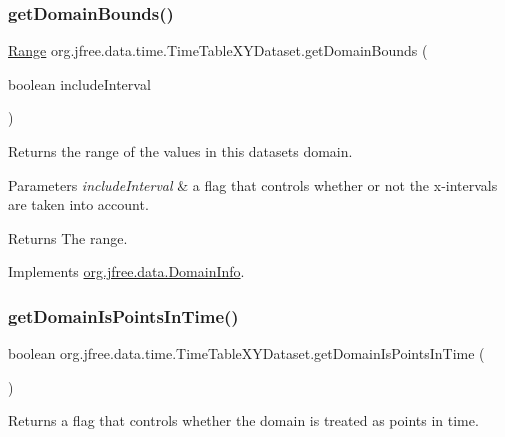 \subsubsection{\texorpdfstring{get\+Domain\+Bounds()}{getDomainBounds()}}
{\footnotesize\ttfamily \mbox{\hyperlink{classorg_1_1jfree_1_1data_1_1_range}{Range}} org.\+jfree.\+data.\+time.\+Time\+Table\+X\+Y\+Dataset.\+get\+Domain\+Bounds (\begin{DoxyParamCaption}\item[{boolean}]{include\+Interval }\end{DoxyParamCaption})}

Returns the range of the values in this dataset\textquotesingle{}s domain.


\begin{DoxyParams}{Parameters}
{\em include\+Interval} & a flag that controls whether or not the x-\/intervals are taken into account.\\
\hline
\end{DoxyParams}
\begin{DoxyReturn}{Returns}
The range. 
\end{DoxyReturn}


Implements \mbox{\hyperlink{interfaceorg_1_1jfree_1_1data_1_1_domain_info_aeb90c8bc6d27c82c39abc99622846732}{org.\+jfree.\+data.\+Domain\+Info}}.

\mbox{\label{classorg_1_1jfree_1_1data_1_1time_1_1_time_table_x_y_dataset_a2fee635aed27d459cef92926f96cbe37}} 
\subsubsection{\texorpdfstring{get\+Domain\+Is\+Points\+In\+Time()}{getDomainIsPointsInTime()}}
{\footnotesize\ttfamily boolean org.\+jfree.\+data.\+time.\+Time\+Table\+X\+Y\+Dataset.\+get\+Domain\+Is\+Points\+In\+Time (\begin{DoxyParamCaption}{ }\end{DoxyParamCaption})}

Returns a flag that controls whether the domain is treated as \textquotesingle{}points in time\textquotesingle{}. 

